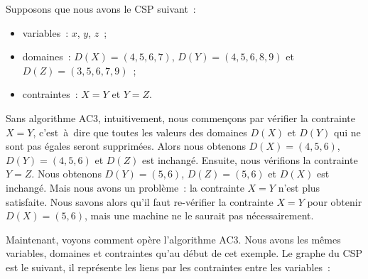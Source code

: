\begin{example}
\label{example:data:ac3}

Supposons que nous avons le CSP suivant~:
%
\begin{itemize}

\item variables~: $x$, $y$, $z$~;

\item domaines~: $D(X) = (4, 5, 6, 7)$, $D(Y) = (4, 5, 6, 8, 9)$ et $D(Z) = (3,
5, 6, 7, 9)$~;

\item contraintes~: $X = Y$ et $Y = Z$.

\end{itemize}

Sans algorithme AC3, intuitivement, nous commençons par vérifier la contrainte
$X = Y$, c'est~à~dire que toutes les valeurs des domaines $D(X)$ et $D(Y)$ qui
ne sont pas égales seront supprimées. Alors nous obtenons $D(X) = (4, 5, 6)$,
$D(Y) = (4, 5, 6)$ et $D(Z)$ est inchangé. Ensuite, nous vérifions la contrainte
$Y = Z$. Nous obtenons $D(Y) = (5, 6)$, $D(Z) = (5, 6)$ et $D(X)$ est inchangé.
Mais nous avons un problème~: la contrainte $X = Y$ n'est plus satisfaite. Nous
savons alors qu'il faut re-vérifier la contrainte $X = Y$ pour obtenir $D(X) =
(5, 6)$, mais une machine ne le saurait pas nécessairement.

Maintenant, voyons comment opère l'algorithme AC3. Nous avons les mêmes
variables, domaines et contraintes qu'au début de cet exemple. Le graphe du CSP
est le suivant, il représente les liens par les contraintes entre les
variables~:



\end{example}
